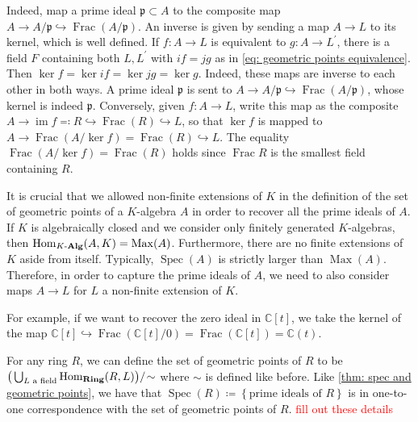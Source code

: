 \documentclass[11pt,leqno]{article}
\newcommand{\sai}[1]{\textcolor{red}{#1}}
\theoremstyle{plain}
\theoremstyle{definition}
\numberwithin{equation}{section}
\numberwithin{lem}{section}
\newcommand{\cbr}[1]{\left\{#1\right\}}
\DeclareMathOperator{\im}{im}
\DeclareMathOperator{\Hom}{Hom}
\DeclareMathOperator{\Max}{Max}
\DeclareMathOperator{\Spec}{Spec}
\DeclareMathOperator{\Frac}{Frac}
\newcommand{\catname}[1]{{\normalfont\mathbf{#1}}}
\newcommand{\Ring}{\catname{Ring}}
\newcommand{\Kalg}{K\text{-}\catname{Alg}}
\begin{document}
Indeed, map a prime ideal $\mathfrak p\subset A$ to the composite map $A\to A/\mathfrak p \hookrightarrow \Frac(A/\mathfrak p)$. An inverse is given by sending a map $A\to L$ to its kernel, which is well defined. If $f\colon A\to L$ is equivalent to $g\colon A\to L^\prime$, there is a field $F$ containing both $L,L^\prime$ with $if = jg$ as in \cref{eq: geometric points equivalence}. Then $\ker f = \ker if = \ker jg = \ker g$. Indeed, these maps are inverse to each other in both ways. A prime ideal $\mathfrak p$ is sent to $A\to A/\mathfrak p \hookrightarrow \Frac(A/\mathfrak p)$, whose kernel is indeed $\mathfrak p$. Conversely, given $f\colon A\to L$, write this map as the composite $A\to \im f\eqqcolon R\hookrightarrow \Frac(R) \hookrightarrow L$, so that $\ker f$ is mapped to $A\to \Frac(A/\ker f) = \Frac(R)\hookrightarrow L$. The equality $\Frac(A/\ker f) = \Frac(R)$ holds since $\Frac R$ is the smallest field containing $R$.

It is crucial that we allowed non-finite extensions of $K$ in the definition of the set of geometric points of a $K$-algebra $A$ in order to recover all the prime ideals of $A$. If $K$ is algebraically closed and we consider only finitely generated $K$-algebras, then $\Hom_{\Kalg}(A,K) = \Max(A)$. Furthermore, there are no finite extensions of $K$ aside from itself. Typically, $\Spec(A)$ is strictly larger than $\Max(A)$. Therefore, in order to capture the prime ideals of $A$, we need to also consider maps $A\to L$ for $L$ a non-finite extension of $K$.

For example, if we want to recover the zero ideal in $\mathbb C[t]$, we take the kernel of the map $\mathbb C[t]\hookrightarrow \Frac(\mathbb C[t]/0) = \Frac(\mathbb C[t]) = \mathbb C(t)$.

For any ring $R$, we can define the set of geometric points of $R$ to be $\big(\bigcup_{L \text{ a field}}\Hom_{\Ring}(R,L)\big)/\!\sim$ where $\sim$ is defined like before. Like \cref{thm: spec and geometric points}, we have that $\Spec(R)\coloneqq\cbr{\text{prime ideals of }R}$ is in one-to-one correspondence with the set of geometric points of $R$. \sai{fill out these details} 
\end{document}
